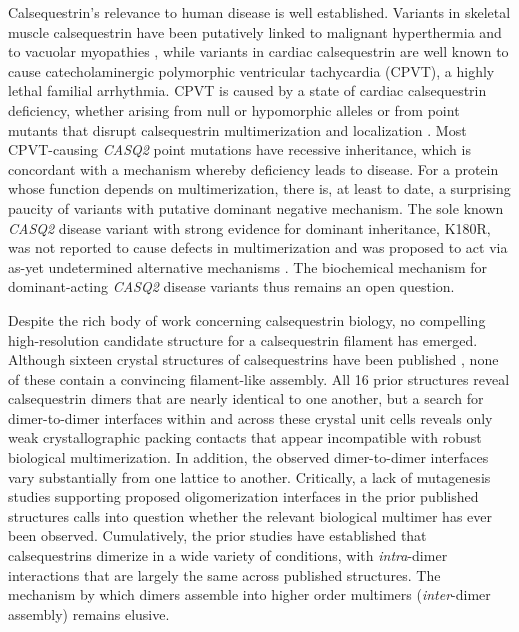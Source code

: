 Calsequestrin's relevance to human disease is well established. Variants in skeletal muscle calsequestrin have been putatively linked to malignant hyperthermia and to vacuolar myopathies \supercite{Lewis2015-zv}, while variants in cardiac calsequestrin are well known to cause catecholaminergic polymorphic ventricular tachycardia (CPVT), a highly lethal familial arrhythmia. CPVT is caused by a state of cardiac calsequestrin deficiency, whether arising from null or hypomorphic alleles or from point mutants that disrupt calsequestrin multimerization and localization \supercite{Bal2010-vf,Bal2011-tv}. Most CPVT-causing \textit{CASQ2} point mutations have recessive inheritance, which is concordant with a mechanism whereby deficiency leads to disease. For a protein whose function depends on multimerization, there is, at least to date, a surprising paucity of variants with putative dominant negative mechanism. The sole known \textit{CASQ2} disease variant with strong evidence for dominant inheritance, K180R, was not reported to cause defects in multimerization and was proposed to act via as-yet undetermined alternative mechanisms \supercite{Gray2016-kx}. The biochemical mechanism for dominant-acting \textit{CASQ2} disease variants thus remains an open question.

Despite the rich body of work concerning calsequestrin biology, no compelling high-resolution candidate structure for a calsequestrin filament has emerged. Although sixteen crystal structures of calsequestrins have been published \supercite{Wang1998-cm,Park2004-bu,Sanchez2012-yl,Lewis2015-zv,Kim2007-sj,Sanchez2012-qi,Lewis2016-am}, none of these contain a convincing filament-like assembly. All 16 prior structures reveal calsequestrin dimers that are nearly identical to one another, but a search for dimer-to-dimer interfaces within and across these crystal unit cells reveals only weak crystallographic packing contacts that appear incompatible with robust biological multimerization. In addition, the observed dimer-to-dimer interfaces vary substantially from one lattice to another. Critically, a lack of mutagenesis studies supporting proposed oligomerization interfaces in the prior published structures calls into question whether the relevant biological multimer has ever been observed. Cumulatively, the prior studies have established that calsequestrins dimerize in a wide variety of conditions, with \textit{intra}-dimer interactions that are largely the same across published structures. The mechanism by which dimers assemble into higher order multimers (\textit{inter}-dimer assembly) remains elusive.

